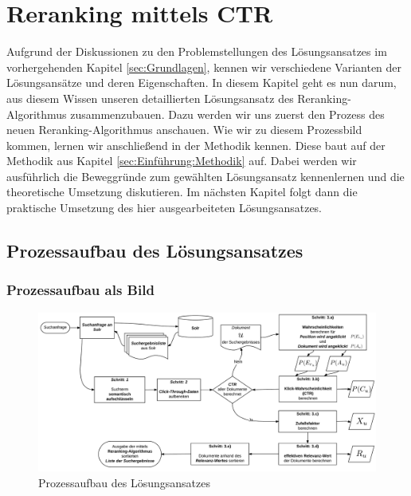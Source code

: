 %
\chapter{Reranking mittels CTR}
\label{sec:Reranking}

Aufgrund der Diskussionen zu den Problemstellungen des Lösungsansatzes im vorhergehenden Kapitel \ref{sec:Grundlagen}, kennen wir verschiedene Varianten der Lösungsansätze und deren Eigenschaften. In diesem Kapitel geht es nun darum, aus diesem Wissen unseren detaillierten Lösungsansatz des Reranking-Algorithmus zusammenzubauen. Dazu werden wir uns zuerst den Prozess des neuen Reranking-Algorithmus anschauen. Wie wir zu diesem Prozessbild kommen, lernen wir anschließend in der Methodik kennen. Diese baut auf der Methodik aus Kapitel \ref{sec:Einführung:Methodik} auf. Dabei werden wir ausführlich die Beweggründe zum gewählten Lösungsansatz kennenlernen und die theoretische Umsetzung diskutieren. Im nächsten Kapitel folgt dann die praktische Umsetzung des hier ausgearbeiteten Lösungsansatzes.


\section{Prozessaufbau des Lösungsansatzes}
\label{sec:Reranking:Prozessaufbau}

\subsection{Prozessaufbau als Bild}
\label{sec:Reranking:Prozessaufbau:ProzessaufbauBild}

\begin{figure}[H]
\centering
\vspace{-1em}
\caption[Prozessaufbau des Lösungsansatzes]{Prozessaufbau des Lösungsansatzes}
\label{fig:Prozessaufbau}
\includegraphics[width=\linewidth]{gfx/ProzessaufbauBild}
\vspace{-2em}
\end{figure}
		
